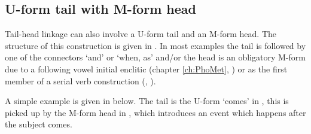 \subsection{U-form tail with M-form head}\label{sec:UforTaiMforHea}
Tail-head linkage can also involve a U-form tail and an M-form head.
The structure of this construction is given in .
In most examples the tail is followed by one of the connectors
 `and' or   `when, as' and/or the head is an obligatory
M-form due to a following vowel initial enclitic (chapter \ref{ch:PhoMet}, )
or as the first member of a serial verb construction (, ).

\begin{exe}
	\label{ex:THL U/M}
\end{exe}

A simple example is given in  below.
The tail is the U-form  `comes' in ,
this is picked up by the M-form head in ,
which introduces an event which happens after the subject comes.

\begin{exe}
	\label{ex:120923-1, 6.56-6.59}
	\begin{xlist}
		\label{ex:120923-1, 6.56}
		\label{ex:120923-1, 6.59 2}
	\end{xlist}
\end{exe}

